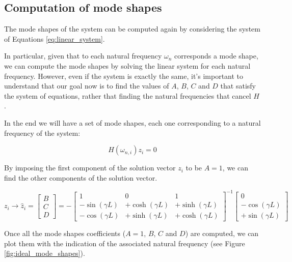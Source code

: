 \subsection{Computation of mode shapes}
\label{subsec:mode_shapes}

The mode shapes of the system can be computed again by considering the system of Equations \ref{eq:linear_system}.

In particular, given that to each natural frequency $\omega_n$ corresponds a mode shape, we can compute the mode shapes by solving the linear system for each natural frequency.
However, even if the system is exactly the same, it's important to understand that our goal now is to find the values of $A$, $B$, $C$ and $D$ that satisfy the system of equations, rather that finding the natural frequencies that cancel $H$.

In the end we will have a set of mode shapes, each one corresponding to a natural frequency of the system:

\begin{equation}
    H(\omega_{n, i}) z_i = 0
\end{equation}

By imposing the first component of the solution vector $z_i$ to be $A = 1$, we can find the other components of the solution vector.

\begin{equation}
    [H(\omega_{n, i})] z_i
    \rightarrow
    \hat z_i
    =
    \begin{bmatrix}
        B \\
        C \\
        D
    \end{bmatrix}
    =
    - \begin{bmatrix}
        1               & 0                & 1                \\
        -\sin(\gamma L) & +\cosh(\gamma L) & +\sinh(\gamma L) \\
        -\cos(\gamma L) & +\sinh(\gamma L) & +\cosh(\gamma L)
    \end{bmatrix}^{-1}
    \begin{bmatrix}
        0               \\
        -\cos(\gamma L) \\
        +\sin(\gamma L)
    \end{bmatrix}
    \label{eq:linear_system_for_mode_shapes}
\end{equation}

Once all the mode shapes coefficients ($A = 1$, $B$, $C$ and $D$) are computed, we can plot them with the indication of the associated natural frequency (see Figure \ref{fig:ideal_mode_shapes}).

